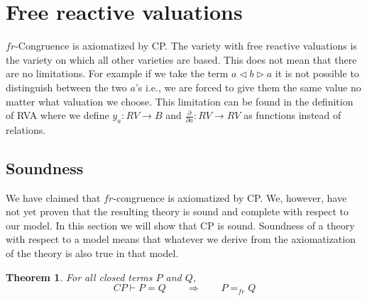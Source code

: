 \documentclass[a4paper,twoside,openright]{report}
\newcommand{\dd}[1]{\frac{\partial}{\partial #1}}
\newcommand{\lef}{\ensuremath{\triangleleft}}
\newcommand{\rig}{\ensuremath{\triangleright}}
\newtheorem{thm}[theorem]{Theorem}
\begin{document}
\section{Free reactive valuations}
$fr$-Congruence is axiomatized by CP. The variety with free reactive valuations is the variety on which all other varieties are based. This does not mean that there are no limitations. For example if we take the term $a\lef b\rig a$ it is not possible to distinguish between the two $a$'s i.e., we are forced to give them the same value no matter what valuation we choose. This limitation can be found in the definition of RVA where we define $y_a:RV\to B$ and $\dd a:RV\to RV$ as functions instead of relations.

\subsection{Soundness}
We have claimed that $fr$-congruence is axiomatized by CP. We, however, have not yet proven that the resulting theory is sound and complete with respect to our model. In this section we will show that CP is sound. Soundness of a theory with respect to a model means that whatever we derive from the axiomatization of the theory is also true in that model.
\begin{thm}\label{soundness cp}
For all closed terms $P$ and $Q$, 
\[
CP\vdash P=Q\qquad\Longrightarrow\qquad P=_{fr}Q
\]
\end{thm}
\end{document}

